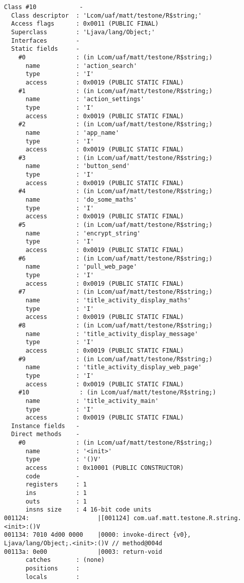 \begin{lstlisting}
Class #10            -
  Class descriptor  : 'Lcom/uaf/matt/testone/R$string;'
  Access flags      : 0x0011 (PUBLIC FINAL)
  Superclass        : 'Ljava/lang/Object;'
  Interfaces        -
  Static fields     -
    #0              : (in Lcom/uaf/matt/testone/R$string;)
      name          : 'action_search'
      type          : 'I'
      access        : 0x0019 (PUBLIC STATIC FINAL)
    #1              : (in Lcom/uaf/matt/testone/R$string;)
      name          : 'action_settings'
      type          : 'I'
      access        : 0x0019 (PUBLIC STATIC FINAL)
    #2              : (in Lcom/uaf/matt/testone/R$string;)
      name          : 'app_name'
      type          : 'I'
      access        : 0x0019 (PUBLIC STATIC FINAL)
    #3              : (in Lcom/uaf/matt/testone/R$string;)
      name          : 'button_send'
      type          : 'I'
      access        : 0x0019 (PUBLIC STATIC FINAL)
    #4              : (in Lcom/uaf/matt/testone/R$string;)
      name          : 'do_some_maths'
      type          : 'I'
      access        : 0x0019 (PUBLIC STATIC FINAL)
    #5              : (in Lcom/uaf/matt/testone/R$string;)
      name          : 'encrypt_string'
      type          : 'I'
      access        : 0x0019 (PUBLIC STATIC FINAL)
    #6              : (in Lcom/uaf/matt/testone/R$string;)
      name          : 'pull_web_page'
      type          : 'I'
      access        : 0x0019 (PUBLIC STATIC FINAL)
    #7              : (in Lcom/uaf/matt/testone/R$string;)
      name          : 'title_activity_display_maths'
      type          : 'I'
      access        : 0x0019 (PUBLIC STATIC FINAL)
    #8              : (in Lcom/uaf/matt/testone/R$string;)
      name          : 'title_activity_display_message'
      type          : 'I'
      access        : 0x0019 (PUBLIC STATIC FINAL)
    #9              : (in Lcom/uaf/matt/testone/R$string;)
      name          : 'title_activity_display_web_page'
      type          : 'I'
      access        : 0x0019 (PUBLIC STATIC FINAL)
    #10              : (in Lcom/uaf/matt/testone/R$string;)
      name          : 'title_activity_main'
      type          : 'I'
      access        : 0x0019 (PUBLIC STATIC FINAL)
  Instance fields   -
  Direct methods    -
    #0              : (in Lcom/uaf/matt/testone/R$string;)
      name          : '<init>'
      type          : '()V'
      access        : 0x10001 (PUBLIC CONSTRUCTOR)
      code          -
      registers     : 1
      ins           : 1
      outs          : 1
      insns size    : 4 16-bit code units
001124:                   |[001124] com.uaf.matt.testone.R.string.<init>:()V
001134: 7010 4d00 0000    |0000: invoke-direct {v0}, Ljava/lang/Object;.<init>:()V // method@004d
00113a: 0e00              |0003: return-void
      catches       : (none)
      positions     :
      locals        :


\end{lstlisting}
